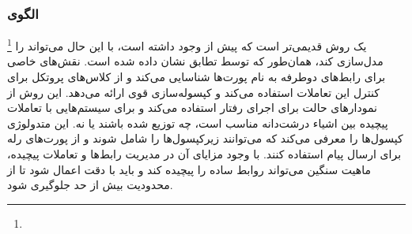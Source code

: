 \subsubsection{الگوی }
\label{archROOMSec}
\begin{RTL}
 \footnote{}
\cite{ref4} یک روش قدیمی‌تر است که پیش از  وجود داشته است، با این حال
 می‌تواند  را مدل‌سازی کند، همان‌طور که توسط تطابق
 نشان داده شده است.
 نقش‌های خاصی برای رابط‌های دوطرفه به نام پورت‌ها شناسایی می‌کند
و از کلاس‌های پروتکل برای کنترل این تعاملات استفاده می‌کند و کپسوله‌سازی قوی ارائه می‌دهد.
این روش از نمودارهای حالت برای اجرای رفتار استفاده می‌کند و برای سیستم‌هایی
با تعاملات پیچیده بین اشیاء درشت‌دانه مناسب است، چه توزیع شده
باشند یا نه. این متدولوژی کپسول‌ها را معرفی می‌کند که می‌توانند زیرکپسول‌ها را شامل شوند
و از پورت‌های رله برای ارسال پیام استفاده کنند. با وجود مزایای آن در مدیریت
رابط‌ها و تعاملات پیچیده، ماهیت سنگین  می‌تواند روابط ساده را
پیچیده کند و باید با دقت اعمال شود تا از محدودیت بیش از حد جلوگیری شود.
\end{RTL}